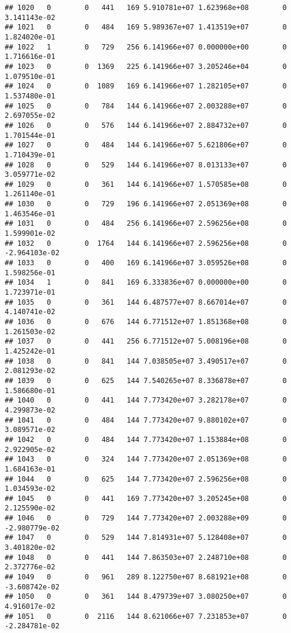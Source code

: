 \documentclass[
]{article}
\begin{document}
\begin{enumerate}
\begin{verbatim}
## 1020   0        0   441   169 5.910781e+07 1.623968e+08        0  3.141143e-02
## 1021   0        0   484   169 5.989367e+07 1.413519e+07        0  1.824020e-01
## 1022   1        0   729   256 6.141966e+07 0.000000e+00        0  1.716616e-01
## 1023   0        0  1369   225 6.141966e+07 3.205246e+04        0  1.079510e-01
## 1024   0        0  1089   169 6.141966e+07 1.282105e+07        0  1.537480e-01
## 1025   0        0   784   144 6.141966e+07 2.003288e+07        0  2.697055e-02
## 1026   0        0   576   144 6.141966e+07 2.884732e+07        0  1.701544e-01
## 1027   0        0   484   144 6.141966e+07 5.621806e+07        0  1.710439e-01
## 1028   0        0   529   144 6.141966e+07 8.013133e+07        0  3.059771e-02
## 1029   0        0   361   144 6.141966e+07 1.570585e+08        0  1.261140e-01
## 1030   0        0   729   196 6.141966e+07 2.051369e+08        0  1.463546e-01
## 1031   0        0   484   256 6.141966e+07 2.596256e+08        0  1.599901e-02
## 1032   0        0  1764   144 6.141966e+07 2.596256e+08        0 -2.964103e-02
## 1033   0        0   400   169 6.141966e+07 3.059526e+08        0  1.598256e-01
## 1034   1        0   841   169 6.333836e+07 0.000000e+00        0  1.723971e-01
## 1035   0        0   361   144 6.487577e+07 8.667014e+07        0  4.140741e-02
## 1036   0        0   676   144 6.771512e+07 1.851368e+08        0  1.261503e-02
## 1037   0        0   441   256 6.771512e+07 5.008196e+08        0  1.425242e-01
## 1038   0        0   841   144 7.038505e+07 3.490517e+07        0  2.081293e-02
## 1039   0        0   625   144 7.540265e+07 8.336878e+07        0  1.586680e-01
## 1040   0        0   441   144 7.773420e+07 3.282178e+07        0  4.299873e-02
## 1041   0        0   484   144 7.773420e+07 9.880102e+07        0  3.089571e-02
## 1042   0        0   484   144 7.773420e+07 1.153884e+08        0  2.922905e-02
## 1043   0        0   324   144 7.773420e+07 2.051369e+08        0  1.684163e-01
## 1044   0        0   625   144 7.773420e+07 2.596256e+08        0  1.034593e-02
## 1045   0        0   441   169 7.773420e+07 3.205245e+08        0  2.125590e-02
## 1046   0        0   729   144 7.773420e+07 2.003288e+09        0 -2.980779e-02
## 1047   0        0   529   144 7.814931e+07 5.128408e+07        0  3.401820e-02
## 1048   0        0   441   144 7.863503e+07 2.248710e+08        0  2.372776e-02
## 1049   0        0   961   289 8.122750e+07 8.681921e+08        0 -3.608742e-02
## 1050   0        0   361   144 8.479739e+07 3.080250e+07        0  4.916017e-02
## 1051   0        0  2116   144 8.621066e+07 7.231853e+07        0 -2.284781e-02

\end{verbatim}
\end{enumerate}
\end{document}

